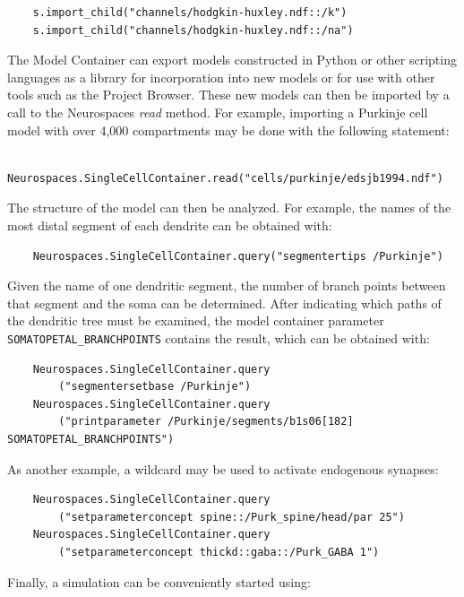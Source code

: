 \documentclass[10pt]{article}
\begin{document}
  \begin{verbatim}
    s.import_child("channels/hodgkin-huxley.ndf::/k")
    s.import_child("channels/hodgkin-huxley.ndf::/na")
\end{verbatim}

The Model Container can export models constructed in Python or other
scripting languages as a library for incorporation into new models or
for use with other tools such as the Project Browser.
These new models can then be imported by a call to the Neurospaces
{\it read} method. For example, importing a Purkinje cell model with
over 4,000 compartments may be done with the following statement:

\begin{verbatim}
    Neurospaces.SingleCellContainer.read("cells/purkinje/edsjb1994.ndf")
\end{verbatim}

The structure of the model can then be analyzed.  For example, the
names of the most distal segment of each dendrite can be obtained
with:

\begin{verbatim}
    Neurospaces.SingleCellContainer.query("segmentertips /Purkinje")
\end{verbatim}

Given the name of one dendritic segment, the number of branch points
between that segment and the soma can be determined. After indicating
which paths of the dendritic tree must be examined, the model
container parameter {\tt SOMATOPETAL\_BRANCHPOINTS} contains the
result, which can be obtained with:

\begin{verbatim}
    Neurospaces.SingleCellContainer.query
        ("segmentersetbase /Purkinje")
    Neurospaces.SingleCellContainer.query
        ("printparameter /Purkinje/segments/b1s06[182] SOMATOPETAL_BRANCHPOINTS")
\end{verbatim}

As another example, a wildcard may be used to activate endogenous
synapses:

\begin{verbatim}
    Neurospaces.SingleCellContainer.query
        ("setparameterconcept spine::/Purk_spine/head/par 25")
    Neurospaces.SingleCellContainer.query
        ("setparameterconcept thickd::gaba::/Purk_GABA 1")
\end{verbatim}

Finally, a simulation can be conveniently started using:
\end{document}
